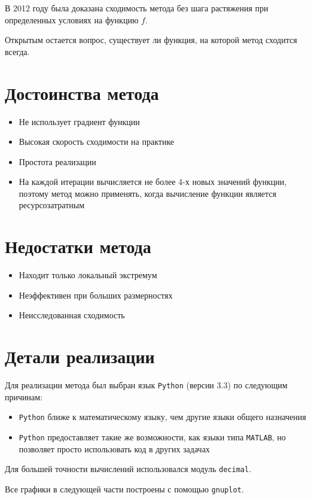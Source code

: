 \documentclass[12pt]{article}
\theoremstyle{plain}
\theoremstyle{remark}
\theoremstyle{definition}
\begin{document}
В 2012 году \cite{convergence2} была доказана сходимость метода без шага растяжения при определенных условиях на функцию $f$.

Открытым остается вопрос, существует ли функция, на которой метод сходится всегда.


\section{Достоинства метода}
\begin{itemize}
\item Не использует градиент функции
\item Высокая скорость сходимости на практике
\item Простота реализации
\item На каждой итерации вычисляется не более 4-х новых значений функции, поэтому метод можно применять, когда вычисление функции является ресурсозатратным

\end{itemize}


\section{Недостатки метода}
\begin{itemize}
\item Находит только локальный экстремум
\item Неэффективен при больших размерностях
\item Неисследованная сходимость
\end{itemize}

\section{Детали реализации}
Для реализации метода был выбран язык \texttt{Python} (версии 3.3) по следующим причинам: 
\begin{itemize}
\item \texttt{Python} ближе к математическому языку, чем другие языки общего назначения
\item \texttt{Python} предоставляет такие же возможности, как языки типа \texttt{MATLAB}, но позволяет просто использовать код в других задачах

\end{itemize}

Для большей точности вычислений использовался модуль \texttt{decimal}.

Все графики в следующей части построены с помощью \texttt{gnuplot}.
\end{document}
